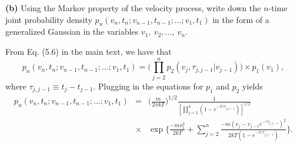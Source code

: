 \textbf{(b)} Using the Markov property of the velocity process, write down the $n$-time joint probability density $p_n(v_n,t_n;v_{n-1},t_{n-1};\ldots ; v_1, t_1)$ in the form of a generalized Gaussian in the variables $v_1,~v_2, \ldots,~ v_n$.

From Eq. (5.6) in the main text, we have that
\begin{equation}
p_n(v_n,t_n;v_{n-1},t_{n-1};\ldots ; v_1, t_1) = \bigg( \prod_{j=2}^{n} p_2(v_j, \tau_{j,j-1}|v_{j-1}) \bigg) \times p_1(v_1),
\end{equation}
where $\tau_{j,j-1} \equiv t_{j}-t_{j-1}$. Plugging in the equations for $p_1$ and $p_2$ yields
\begin{eqnarray}
p_n(v_n,t_n;v_{n-1},t_{n-1};\ldots ; v_1, t_1) &=& \bigg(\frac{m}{2 \pi k T}\bigg)^{1/2} \frac{1}{[\prod_{j=2}^{n} (1-e^{-2\gamma \tau_{j,j-1}})]^{1/2}} \nonumber \\
&\times& \exp\bigg\{ \frac{-m v_1^2}{2kT}+\sum_{j=2}^{n} \frac{-m(v_j-v_{j-1} e^{-\gamma \tau_{j,j-1}})^2}{2 k T (1-e^{-2 \gamma \tau_{j,j-1}})}\bigg\}. \label{eq:n_time_joint_probability}
\end{eqnarray}

